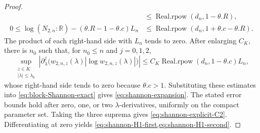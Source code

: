 \documentclass[9pt]{extarticle}
\theoremstyle{definition}
\theoremstyle{remark}
\newcommand{\R}{\mathbb R}
\newcommand{\abs}[1]{\left\lvert #1\right\rvert}
\begin{document}
\begin{proof}
\begin{align*}
   &\leq\operatorname{Real.rpow}(d_n,1-\theta.R),\\
 0\leq\log(N_{2,n}:\R)-(\theta.R-1-\theta.c)L_n
   &\leq\operatorname{Real.rpow}(d_n,1+\theta.c-\theta.R).
\end{align*}
The product of each right-hand side with $L_n$ tends to zero. After enlarging
$C_K$, there is $n_0$ such that, for $n_0\leq n$ and $j=0,1,2$,
\[
 \sup_{\substack{z\in K\\\abs\lambda\leq\lambda_0}}
 \abs{\partial_\lambda^j\bigl(w_{2,n,z}(\lambda)
   \abs{\log w_{2,n,z}(\lambda)}\bigr)}
 \leq C_K\operatorname{Real.rpow}(d_n,1-\theta.c)L_n,
\]
whose right-hand side tends to zero because $\theta.c>1$. Substituting these
estimates into
\cref{eq:block-Shannon-exact} gives \cref{eq:shannon-expansion}.  The stated
error bounds hold after zero, one, or two $\lambda$-derivatives, uniformly on
the compact parameter set.  Taking the three suprema gives
\cref{eq:shannon-explicit-C2}. Differentiating at zero yields
\cref{eq:shannon-H1-first,eq:shannon-H1-second}.
\end{proof}
\end{document}
